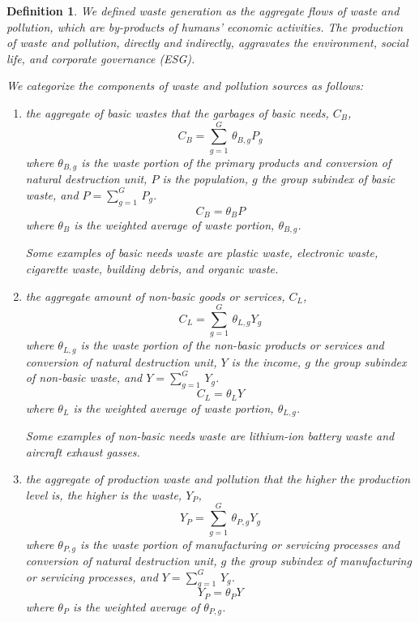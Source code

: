 \documentclass[sn-basic]{sn-jnl}%
\theoremstyle{thmstyleone}%
\theoremstyle{thmstyletwo}%
\theoremstyle{thmstylethree}%
\newtheorem{definition}{Definition}%
\begin{document}
\begin{definition}
	We defined \emph{waste generation} as the aggregate flows of waste and pollution, which are by-products of humans' economic activities. The production of waste and pollution, directly and indirectly, aggravates the environment, social life, and corporate governance (ESG).

	We categorize the components of waste and pollution sources as follows:
	\begin{enumerate}
		\item the aggregate of basic wastes that the garbages of basic needs, $C_B$,
			\begin{equation}\label{cb_detail}
				C_B=\sum_{g=1}^G\,\theta_{B,g} P_g
			\end{equation}
			where $\theta_{B,g}$ is the waste portion of the primary products and conversion of natural destruction unit, $P$ is the population, $g$ the group subindex of basic waste, and $P=\sum_{g=1}^G\, P_g$. 
			\begin{equation}\label{cb}
				C_B=\theta_B P
			\end{equation}
			where $\theta_B$ is the weighted average of waste portion, $\theta_{B,g}$.
			
			Some examples of basic needs waste are plastic waste, electronic waste, cigarette waste, building debris, and organic waste. 
		\item the aggregate amount of non-basic goods or services, $C_L$,
			\begin{equation}\label{cl_detail}
				C_L=\sum_{g=1}^G\,\theta_{L,g} Y_g
			\end{equation}
			where $\theta_{L,g}$ is the waste portion of the non-basic products or services and conversion of natural destruction unit, $Y$ is the income, $g$ the group subindex of non-basic waste, and $Y=\sum_{g=1}^G\, Y_g$.
			\begin{equation}\label{cl}
				C_L=\theta_L Y
			\end{equation}
			where $\theta_L$ is the weighted average of waste portion, $\theta_{L,g}$.
			
			Some examples of non-basic needs waste are lithium-ion battery waste and aircraft exhaust gasses. 
		\item the aggregate of production waste and pollution that the higher the production level is, the higher is the waste, $Y_P$,
			\begin{equation}\label{yp_detail}
				Y_P=\sum_{g=1}^G\,\theta_{P,g} Y_g
			\end{equation}
			where $\theta_{P,g}$ is the waste portion of manufacturing or servicing processes and conversion of natural destruction unit, $g$ the group subindex of manufacturing or servicing processes, and $Y=\sum_{g=1}^G\, Y_g$.
			\begin{equation}\label{yp}
				Y_P=\theta_P Y
			\end{equation}
			where $\theta_P$ is the weighted average of $\theta_{P,g}$.
			

\end{enumerate}
\end{definition}
\end{document}
